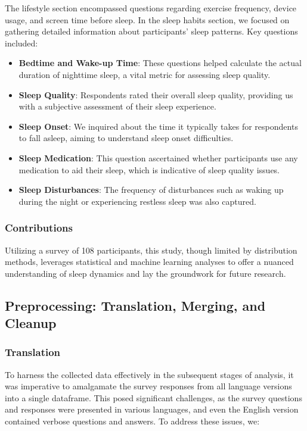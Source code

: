 \documentclass[conference]{IEEEtran}
\begin{document}
The lifestyle section encompassed questions regarding exercise frequency, device usage, and screen time before sleep. In the sleep habits section, we focused on gathering detailed information about participants' sleep patterns. Key questions included:
\begin{itemize}
    \item\textbf{Bedtime and Wake-up Time}: These questions helped calculate the actual duration of nighttime sleep, a vital metric for assessing sleep quality.
    \item\textbf{Sleep Quality}: Respondents rated their overall sleep quality, providing us with a subjective assessment of their sleep experience.
    \item\textbf{Sleep Onset}: We inquired about the time it typically takes for respondents to fall asleep, aiming to understand sleep onset difficulties.
    \item\textbf{Sleep Medication}: This question ascertained whether participants use any medication to aid their sleep, which is indicative of sleep quality issues.
    \item\textbf{Sleep Disturbances}: The frequency of disturbances such as waking up during the night or experiencing restless sleep was also captured.
\end{itemize}
\subsubsection*{Contributions}
Utilizing a survey of 108 participants, this study, though limited by distribution methods, leverages statistical and machine learning analyses to offer a nuanced understanding of sleep dynamics and lay the groundwork for future research.\subsection{Preprocessing: Translation, Merging, and Cleanup}
\subsubsection*{Translation}
To harness the collected data effectively in the subsequent stages of analysis, it was imperative to amalgamate the survey responses from all language versions into a single dataframe. This posed significant challenges, as the survey questions and responses were presented in various languages, and even the English version contained verbose questions and answers. To address these issues, we:
\end{document}
